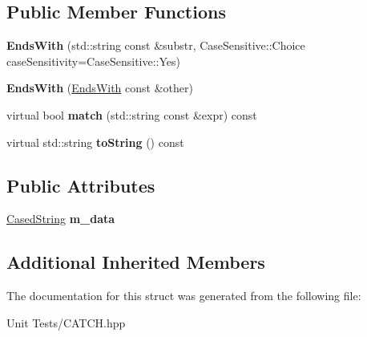 \subsection*{Public Member Functions}
\begin{DoxyCompactItemize}
\item 
{\bfseries Ends\+With} (std\+::string const \&substr, Case\+Sensitive\+::\+Choice case\+Sensitivity=Case\+Sensitive\+::\+Yes)\hypertarget{structCatch_1_1Matchers_1_1Impl_1_1StdString_1_1EndsWith_ae90c02ff06c9dd5e62218b2b521e8cab}{}\label{structCatch_1_1Matchers_1_1Impl_1_1StdString_1_1EndsWith_ae90c02ff06c9dd5e62218b2b521e8cab}

\item 
{\bfseries Ends\+With} (\hyperlink{structCatch_1_1Matchers_1_1Impl_1_1StdString_1_1EndsWith}{Ends\+With} const \&other)\hypertarget{structCatch_1_1Matchers_1_1Impl_1_1StdString_1_1EndsWith_a9321aac07fb17613a7993e99003b3be2}{}\label{structCatch_1_1Matchers_1_1Impl_1_1StdString_1_1EndsWith_a9321aac07fb17613a7993e99003b3be2}

\item 
virtual bool {\bfseries match} (std\+::string const \&expr) const \hypertarget{structCatch_1_1Matchers_1_1Impl_1_1StdString_1_1EndsWith_ad0e03d7f54ffa5859f84faebccf11e76}{}\label{structCatch_1_1Matchers_1_1Impl_1_1StdString_1_1EndsWith_ad0e03d7f54ffa5859f84faebccf11e76}

\item 
virtual std\+::string {\bfseries to\+String} () const \hypertarget{structCatch_1_1Matchers_1_1Impl_1_1StdString_1_1EndsWith_a54715c94c215a1fc5fb6336acf52eb06}{}\label{structCatch_1_1Matchers_1_1Impl_1_1StdString_1_1EndsWith_a54715c94c215a1fc5fb6336acf52eb06}

\end{DoxyCompactItemize}
\subsection*{Public Attributes}
\begin{DoxyCompactItemize}
\item 
\hyperlink{structCatch_1_1Matchers_1_1Impl_1_1StdString_1_1CasedString}{Cased\+String} {\bfseries m\+\_\+data}\hypertarget{structCatch_1_1Matchers_1_1Impl_1_1StdString_1_1EndsWith_a344d8433f3ba3e0de301ab16ed6dd746}{}\label{structCatch_1_1Matchers_1_1Impl_1_1StdString_1_1EndsWith_a344d8433f3ba3e0de301ab16ed6dd746}

\end{DoxyCompactItemize}
\subsection*{Additional Inherited Members}


The documentation for this struct was generated from the following file\+:\begin{DoxyCompactItemize}
\item 
Unit Tests/C\+A\+T\+C\+H.\+hpp\end{DoxyCompactItemize}
